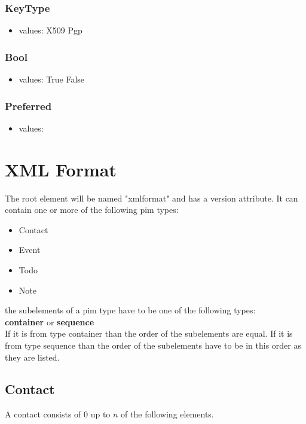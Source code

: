 \documentclass[a4paper,11pt]{article}
\begin{document}
\subsubsection{KeyType}
\begin{itemize}
  \item values:
  \subitem X509
  \subitem Pgp
\end{itemize}

\subsubsection{Bool}
\begin{itemize}
  \item values:
  \subitem True
  \subitem False
\end{itemize}

\subsubsection{Preferred}
\begin{itemize}
  \item values:
\end{itemize}

\section{XML Format}
The root element will be named "xmlformat" and has a version attribute.
It can contain one or more of the following pim types:
\begin{itemize}
  \item Contact
  \item Event
  \item Todo
  \item Note
\end{itemize}
the subelements of a pim type have to be one of the following types: \\
\textbf{container} or \textbf{sequence} \\
If it is from type container than the order of the subelements are equal.
If it is from type sequence than the order of the subelements have to be in this order as they are listed.



\subsection{Contact}

A contact consists of 0 up to $n$ of the following elements.
\end{document}
